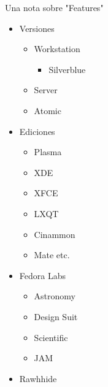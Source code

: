 \documentclass[presentation]{beamer}
\begin{document}
\begin{frame}[label=sec-10]{Una nota sobre "Features"}
\begin{itemize}
\item Versiones
\begin{itemize}
\item Workstation
\begin{itemize}
\item Silverblue
\end{itemize}
\item Server
\item Atomic
\end{itemize}
\item Ediciones
\begin{itemize}
\item Plasma
\item XDE
\item XFCE
\item LXQT
\item Cinammon
\item Mate etc.
\end{itemize}
\item Fedora Labs 
\begin{itemize}
\item Astronomy
\item Design Suit
\item Scientific
\item JAM
\end{itemize}
\item Rawhhide
\end{itemize}
\end{frame}
\end{document}
